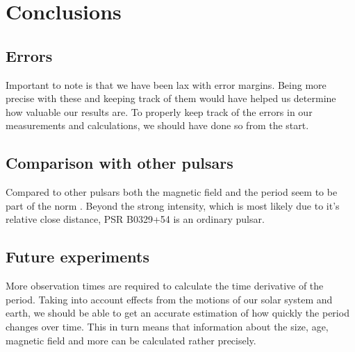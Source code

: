 \documentclass[twoside,twocolumn]{article}
\begin{document}
	\section{Conclusions}
	\subsection{Errors}
	Important to note is that we have been lax with error margins. Being more precise with these and keeping track of them would have helped us determine how valuable our results are. To properly keep track of the errors in our measurements and calculations, we should have done so from the start. 

	\subsection{Comparison with other pulsars}
	Compared to other pulsars both the magnetic field and the period seem to be part of the norm \cite{Burke}. Beyond the strong intensity, which is most likely due to it's relative close distance, PSR B0329+54 is an ordinary pulsar.

	\subsection{Future experiments}
	More observation times are required to calculate the time derivative of the period. Taking into account effects from the motions of our solar system and earth, we should be able to get an accurate estimation of how quickly the period changes over time. This in turn means that information about the size, age, magnetic field and more can be calculated rather precisely. 
	
%
%
\end{document}
